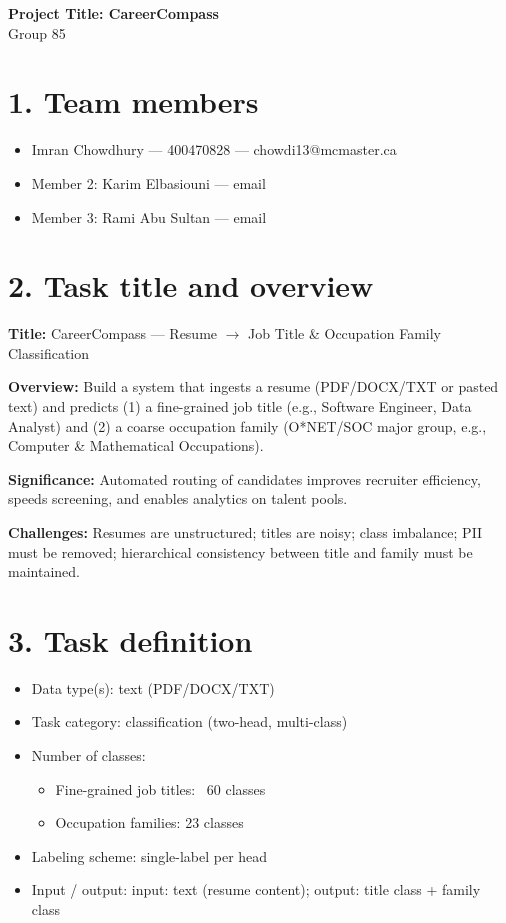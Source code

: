\documentclass[12pt]{article}
\begin{document}
\begin{center}
  {\Large\bfseries Project Title: CareerCompass}\\[8pt]
  {\normalsize Group 85}
\end{center}

\section*{1. Team members}
\begin{itemize}
  \item Imran Chowdhury — 400470828 — chowdi13@mcmaster.ca
  \item Member 2: Karim Elbasiouni — email
  \item Member 3: Rami Abu Sultan — email
\end{itemize}

\section*{2. Task title and overview}
\textbf{Title:} CareerCompass — Resume $\rightarrow$ Job Title \& Occupation Family Classification

\textbf{Overview:} Build a system that ingests a resume (PDF/DOCX/TXT or pasted text) and predicts (1) a fine-grained job title (e.g., Software Engineer, Data Analyst) and (2) a coarse occupation family (O*NET/SOC major group, e.g., Computer \& Mathematical Occupations).  

\textbf{Significance:} Automated routing of candidates improves recruiter efficiency, speeds screening, and enables analytics on talent pools.  

\textbf{Challenges:} Resumes are unstructured; titles are noisy; class imbalance; PII must be removed; hierarchical consistency between title and family must be maintained.

\section*{3. Task definition}
\begin{itemize}
  \item Data type(s): text (PDF/DOCX/TXT)
  \item Task category: classification (two-head, multi-class)
  \item Number of classes:
    \begin{itemize}
      \item Fine-grained job titles: ~60 classes
      \item Occupation families: 23 classes
    \end{itemize}
  \item Labeling scheme: single-label per head
  \item Input / output: input: text (resume content); output: title class + family class
\end{itemize}
\end{document}
